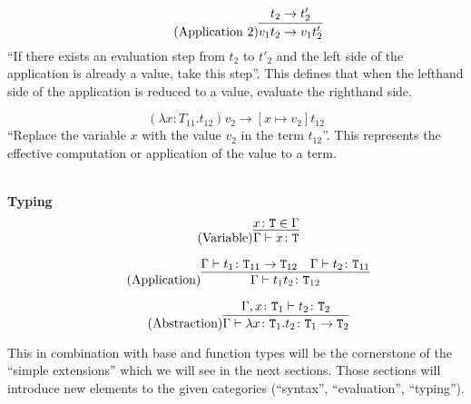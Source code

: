 \begin{equation*}
    \tag{Application 2}
    \infer{
        v_1 t_2 \rightarrow v_1 t'_2
    }{
        t_2 \rightarrow t'_2
    }
\end{equation*}
``If there exists an evaluation step from $t_2$ to $t'_2$ and the left
side of the application is already a value, take this step''. This defines
that when the lefthand side of the application is reduced to a value, evaluate
the righthand side.

\begin{equation*}
    \tag{Application Abstraction}
    (\lambda x \colon T_{11} . t_{12}) v_2 \rightarrow [x \mapsto v_2] t_{12}
\end{equation*}
``Replace the variable $x$ with the value $v_2$ in the term $t_{12}$''. This represents
the effective computation or application of the value to a term.

~\\
\textbf{Typing}
\begin{equation*}
    \tag{Variable}
    \infer{
        \Gamma \vdash x \colon \texttt{T}
    }{
        x \colon \texttt{T} \in \Gamma
    }
\end{equation*}

\begin{equation*}
    \tag{Application}
    \infer{
        \Gamma \vdash t_1 t_2 \colon \texttt{T}_{12}
    }{
        \Gamma \vdash t_1 \colon \texttt{T}_{11} \rightarrow \texttt{T}_{12}
        &
        \Gamma \vdash t_2 \colon \texttt{T}_{11}
    }
\end{equation*}

\begin{equation*}
    \tag{Abstraction}
    \infer{
        \Gamma \vdash \lambda x \colon \texttt{T}_1 . t_2 \colon \texttt{T}_1 \rightarrow \texttt{T}_2
    }{
        \Gamma,x \colon \texttt{T}_1 \vdash t_2 \colon \texttt{T}_2
    }
\end{equation*}

This in combination with base and function types will be the
cornerstone of the ``simple extensions'' which we will see in the
next sections. Those sections will introduce new elements to the given
categories (``syntax'', ``evaluation'', ``typing'').
